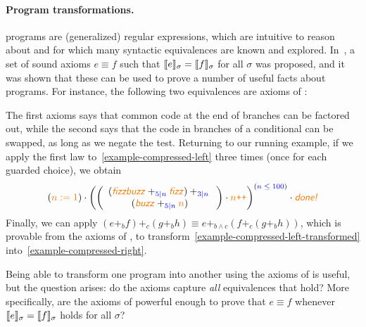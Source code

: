 \documentclass[orivec,envcountsect,envcountsame]{llncs}
\begin{document}
    \paragraph{\bf Program transformations.} \GKAT programs are (generalized) regular expressions, which are intuitive to reason about and for which many syntactic equivalences are known and explored.
    In~\cite{gkatpopl}, a set of sound axioms $e \equiv f$ such that $\llbracket e\rrbracket_\sigma = \llbracket f\rrbracket_\sigma$ for all $\sigma$ was proposed, and it was shown that these can be used to prove a number of useful facts about programs. For instance, the following two equivalences are axioms of \GKAT:\@
    The first axioms says that common code at the end of branches can be factored out, while the second says that the code in branches of a conditional can be swapped, as long as we negate the test.
    Returning to our running example, if we apply the first law to~\eqref{example-compressed-left} three times (once for each guarded choice), we obtain
    \begin{equation}%
    \label{example-compressed-left-transformed}
        (\action{\(n := 1\)}) \cdot
            \left(
                \left(
                \begin{array}{c}
                    ( \action{\textsl{fizzbuzz}} +_{\test{\(5|n\)}} \action{\textsl{fizz}}) +_{\test{\(3|n\)}} {} \\
                    (\action{\textsl{buzz}} +_{\test{\(5|n\)}} \action{\(n\)})
                \end{array}
                \right)
                \cdot \action{\(n\)\texttt{++}}
            \right)^{(\test{\(n \leq 100\)})}
            \cdot \action{\textsl{done!}}
    \end{equation}
    Finally, we can apply $(e +_b f) +_c (g +_b h) \equiv e +_{b \wedge c} (f +_c (g +_b h))$, which is provable from the axioms of \GKAT, to transform~\eqref{example-compressed-left-transformed} into~\eqref{example-compressed-right}.

    Being able to transform one \GKAT program into another using the axioms of \GKAT is useful, but the question arises: do the axioms capture \emph{all} equivalences that hold?
    More specifically, are the axioms of \GKAT powerful enough to prove that $e \equiv f$ whenever $\llbracket e\rrbracket_\sigma = \llbracket f\rrbracket_\sigma$ holds for all $\sigma$?
\end{document}
